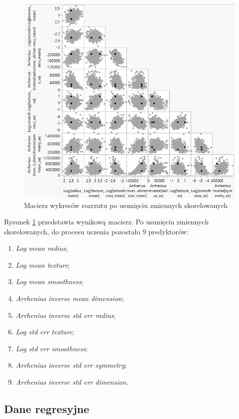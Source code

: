 	\begin{figure}[!ht]
		\centering
		\includegraphics[width=0.9\linewidth]{Rysunki/Rozdzial3/scatter}
		\caption{Macierz wykresów rozrzutu po usunięciu zmiennych skorelowanych}
		\label{scatter}
	\end{figure}
	
	Rysunek \ref{scatter} przedstawia wynikową macierz. Po usunięciu zmiennych skorelowanych, do procesu uczenia pozostało 9 predyktorów:
	
	\begin{enumerate}
		\item \textit{Log mean radius};
		\item \textit{Log mean texture};
		\item \textit{Log mean smoothness};
		\item \textit{Arrhenius inverse mean dimension};
		\item \textit{Arrhenius inverse std err radius};
		\item \textit{Log std err texture};
		\item \textit{Log std err smoothness};
		\item \textit{Arrhenius inverse std err symmetry};
		\item \textit{Arrhenius inverse std err dimension}.
	\end{enumerate}

	\subsection{Dane regresyjne}	
